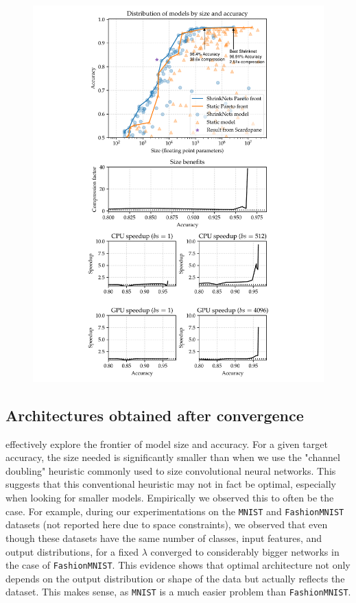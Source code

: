 \begin{figure}
\begin{minipage}{.49\textwidth}
  \includegraphics[width=\textwidth]{COVER_FC_summary-arrows}
\end{minipage}
\end{figure}

\subsection{Architectures obtained after convergence}
\shrink effectively explore the frontier of model size and accuracy. For a
given target accuracy, the size needed is significantly smaller than when we use the
"channel doubling" heuristic commonly used to size convolutional neural networks.
This suggests that this conventional heuristic may not in fact be optimal,
especially when looking for smaller models.  Empirically we observed this to
often be the case.  For example, during our experimentations on the
\texttt{MNIST} \cite{Lecun1998} and \texttt{FashionMNIST} \cite{Xiao2017}
datasets (not reported here due to space constraints), we observed that even
though these datasets have the same number of classes, input features, and
output distributions, for a fixed $\lambda$ \shrink converged to
considerably bigger networks in the case of \texttt{FashionMNIST}. This evidence
shows that optimal architecture not only depends on the output distribution or
shape of the data but actually reflects the dataset.  This makes sense, as
\texttt{MNIST} is a much easier problem than \texttt{FashionMNIST}.

